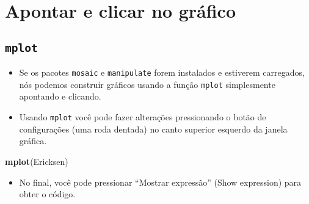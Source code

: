 \documentclass[]{article}
\newenvironment{Shaded}{\begin{snugshade}}{\end{snugshade}}
\newcommand{\KeywordTok}[1]{\textcolor[rgb]{0.13,0.29,0.53}{\textbf{#1}}}
\newcommand{\NormalTok}[1]{#1}
\providecommand{\tightlist}{%
  \setlength{\itemsep}{0pt}\setlength{\parskip}{0pt}}
\begin{document}
\section{Apontar e clicar no gráfico}\label{apontar-e-clicar-no-grafico}

\subsection{\texorpdfstring{\texttt{mplot}}{mplot}}\label{mplot}

\begin{itemize}
\tightlist
\item
  Se os pacotes \texttt{mosaic} e \texttt{manipulate} forem instalados e
  estiverem carregados, nós podemos construir gráficos usando a função
  \texttt{mplot} simplesmente apontando e clicando.
\item
  Usando \texttt{mplot} você pode fazer alterações pressionando o botão
  de configurações (uma roda dentada) no canto superior esquerdo da
  janela gráfica.
\end{itemize}

\begin{Shaded}
\begin{Highlighting}[]
\KeywordTok{mplot}\NormalTok{(Ericksen)}
\end{Highlighting}
\end{Shaded}

\begin{itemize}
\tightlist
\item
  No final, você pode pressionar ``Mostrar expressão'' (Show expression)
  para obter o código.
\end{itemize}
\end{document}

